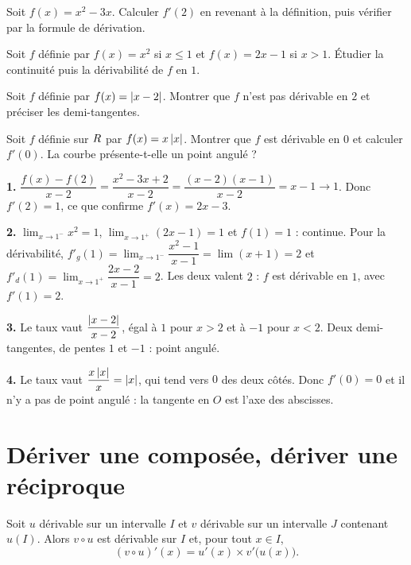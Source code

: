 \begin{entrainement}
\exo[\niveau{1}] Soit $f(x) = x^{2}-3x$. Calculer $f'(2)$ en revenant à la
définition, puis vérifier par la formule de dérivation.

\exo[\niveau{2}] Soit $f$ définie par $f(x) = x^{2}$ si $x \leq 1$ et
$f(x) = 2x-1$ si $x > 1$. Étudier la continuité puis la dérivabilité de $f$
en $1$.

\exo[\niveau{2}] Soit $f$ définie par $f(x) = \left|x-2\right|$. Montrer que $f$
n'est pas dérivable en $2$ et préciser les demi-tangentes.

\exo[\niveau{3}] Soit $f$ définie sur $R$ par $f(x) = x\left|x\right|$. Montrer que
$f$ est dérivable en $0$ et calculer $f'(0)$. La courbe présente-t-elle un
point angulé ?
\end{entrainement}

\begin{corrige}
\textbf{1.} $\dfrac{f(x)-f(2)}{x-2} = \dfrac{x^{2}-3x+2}{x-2} = \dfrac{(x-2)(x-1)}{x-2} = x-1 \to 1$.
Donc $f'(2) = 1$, ce que confirme $f'(x) = 2x-3$.

\textbf{2.} $\lim_{x \to 1^{-}} x^{2} = 1$, $\lim_{x \to 1^{+}} (2x-1) = 1$ et
$f(1) = 1$ : continue. Pour la dérivabilité,
$f'_{g}(1) = \lim_{x \to 1^{-}} \dfrac{x^{2}-1}{x-1} = \lim (x+1) = 2$ et
$f'_{d}(1) = \lim_{x \to 1^{+}} \dfrac{2x-2}{x-1} = 2$. Les deux valent $2$ :
$f$ est dérivable en $1$, avec $f'(1) = 2$.

\textbf{3.} Le taux vaut $\dfrac{\left|x-2\right|}{x-2}$, égal à $1$ pour $x>2$ et à
$-1$ pour $x<2$. Deux demi-tangentes, de pentes $1$ et $-1$ : point angulé.

\textbf{4.} Le taux vaut $\dfrac{x\left|x\right|}{x} = \left|x\right|$, qui tend vers $0$ des
deux côtés. Donc $f'(0) = 0$ et il n'y a pas de point angulé : la tangente en
$O$ est l'axe des abscisses.
\end{corrige}

\section{Dériver une composée, dériver une réciproque}

\begin{theoreme}
Soit $u$ dérivable sur un intervalle $I$ et $v$ dérivable sur un intervalle
$J$ contenant $u(I)$. Alors $v \circ u$ est dérivable sur $I$ et, pour tout
$x \in I$,
\[
  (v \circ u)'(x) = u'(x) \times v'\bigl(u(x)\bigr).
\]
\end{theoreme}

